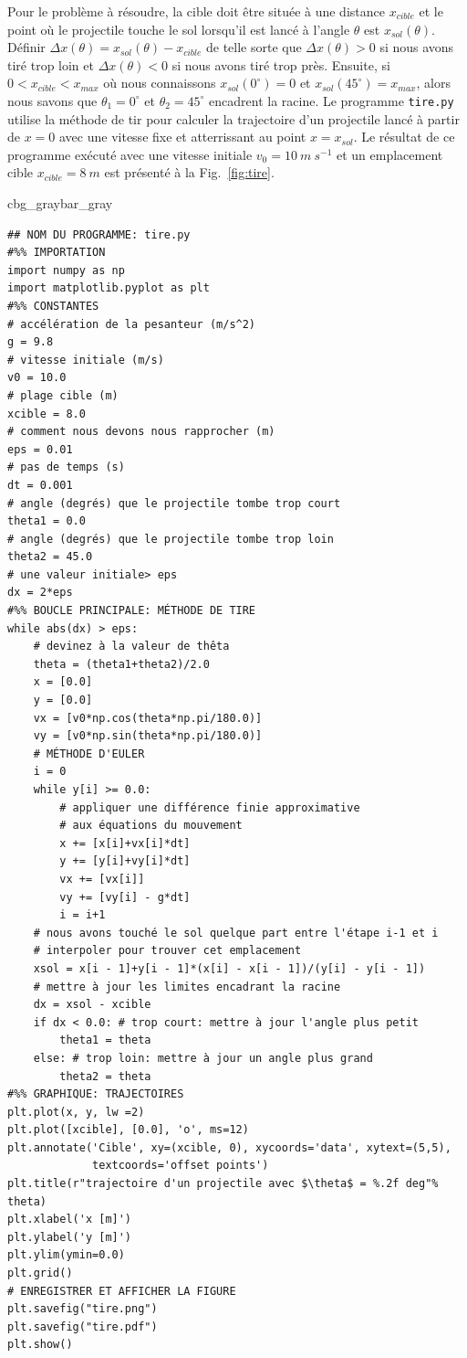 \documentclass[%
oneside,                 %
final,                   %
10pt]{article}
\newenvironment{_pro_tight}[2]{
   \def\FrameCommand{\color{#2}\vrule width 1mm\normalcolor\colorbox{#1}}
   \FrameRule0.6pt\MakeFramed {\advance\hsize-2mm\FrameRestore}\vskip3mm}
   {\vskip0mm\endMakeFramed}
\newenvironment{pro}[2]{
\bgroup\rmfamily
\fboxsep=0mm\relax
\begin{_pro_tight}{#1}{#2}
\list{}{\parsep=-2mm\parskip=0mm\topsep=0pt\leftmargin=2mm
\rightmargin=2\leftmargin\leftmargin=4pt\relax}
\item\relax}
{\endlist\end{_pro_tight}\egroup}
\begin{document}
Pour le problème à résoudre, la cible doit être située à une distance $x_{cible}$ et le point où le projectile touche le sol lorsqu’il est lancé à l'angle $\theta$ est $x_{sol}(\theta)$. Définir $\Delta x(\theta) = x_{sol}(\theta) - x_{cible}$ de telle sorte que $\Delta x(\theta) > 0$ si nous avons tiré trop loin et $\Delta x(\theta) < 0$ si nous avons tiré trop près. Ensuite, si $0 <x_{cible} <x_{max}$ où nous connaissons $x_{sol}(0^\circ) = 0$ et $x_{sol}(45^\circ) = x_{max}$, alors nous savons que $\theta_1 = 0^\circ$ et $\theta_2 = 45^\circ$ encadrent la racine. Le programme \texttt{tire.py} utilise la méthode de tir pour calculer la trajectoire d'un projectile lancé à partir de $x = 0$ avec une vitesse fixe et atterrissant au point $x = x_{sol}$. Le résultat de ce programme exécuté avec une vitesse initiale $v_0 = 10 \ m \ s^{-1}$ et un emplacement cible $x_{cible} = 8 \ m$ est présenté à la Fig.~\ref{fig:tire}.

\begin{pro}{cbg_gray}{bar_gray}\begin{verbatim}
## NOM DU PROGRAMME: tire.py
#%% IMPORTATION
import numpy as np
import matplotlib.pyplot as plt
#%% CONSTANTES
# accélération de la pesanteur (m/s^2)
g = 9.8
# vitesse initiale (m/s)
v0 = 10.0 
# plage cible (m)
xcible = 8.0 
# comment nous devons nous rapprocher (m)
eps = 0.01 
# pas de temps (s)
dt = 0.001 
# angle (degrés) que le projectile tombe trop court
theta1 = 0.0 
# angle (degrés) que le projectile tombe trop loin
theta2 = 45.0
# une valeur initiale> eps
dx = 2*eps 
#%% BOUCLE PRINCIPALE: MÉTHODE DE TIRE
while abs(dx) > eps:
    # devinez à la valeur de thêta
    theta = (theta1+theta2)/2.0
    x = [0.0]
    y = [0.0]
    vx = [v0*np.cos(theta*np.pi/180.0)]
    vy = [v0*np.sin(theta*np.pi/180.0)]
    # MÉTHODE D'EULER
    i = 0
    while y[i] >= 0.0:
        # appliquer une différence finie approximative 
        # aux équations du mouvement
        x += [x[i]+vx[i]*dt]
        y += [y[i]+vy[i]*dt]
        vx += [vx[i]]
        vy += [vy[i] - g*dt]
        i = i+1
    # nous avons touché le sol quelque part entre l'étape i-1 et i 
    # interpoler pour trouver cet emplacement
    xsol = x[i - 1]+y[i - 1]*(x[i] - x[i - 1])/(y[i] - y[i - 1])
    # mettre à jour les limites encadrant la racine
    dx = xsol - xcible
    if dx < 0.0: # trop court: mettre à jour l'angle plus petit
        theta1 = theta
    else: # trop loin: mettre à jour un angle plus grand
        theta2 = theta
#%% GRAPHIQUE: TRAJECTOIRES
plt.plot(x, y, lw =2)
plt.plot([xcible], [0.0], 'o', ms=12)
plt.annotate('Cible', xy=(xcible, 0), xycoords='data', xytext=(5,5),
             textcoords='offset points')
plt.title(r"trajectoire d'un projectile avec $\theta$ = %.2f deg"% theta)
plt.xlabel('x [m]')
plt.ylabel('y [m]')
plt.ylim(ymin=0.0)
plt.grid()
# ENREGISTRER ET AFFICHER LA FIGURE
plt.savefig("tire.png")
plt.savefig("tire.pdf")
plt.show()
\end{verbatim}
\end{pro}
\noindent
\end{document}
